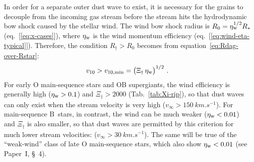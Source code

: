 In order for a separate outer dust wave to exist, it is necessary for
the grains to decouple from the incoming gas stream before the stream
hits the hydrodynamic bow shock caused by the stellar wind.  The wind
bow shock radius is \(R_0 = \eta_{\text{w}}^{1/2} R_*\) (eq.~[\ref{eq:x-cases}]),
where \(\eta_{\text{w}}\) is the wind momentum efficiency
(eq.~[\ref{eq:wind-eta-typical}]).
Therefore, the condition
\(R_\dag > R_0\) becomes from equation~\eqref{eq:Rdag-over-Rstar}:
\begin{equation}
  \label{eq:dust-wave-velocity-condition}
  v_{10} > v_{10,\text{min}} = \bigl( \Xi_\dag \, \eta_{\text{w}} \bigr)^{1/2} \ . 
\end{equation}
For early O main-sequence stars and OB supergiants, the wind
efficiency is generally high (\(\eta_{\text{w}} > 0.1\)) and
\(\Xi_\dag > 2000\) (Tab.~\ref{tab:Xi-rip}), so that dust waves can only
exist when the stream velocity is very high
(\(v_\infty > \SI{150}{km.s^{-1}}\)).  For main-sequence B~stars, in
contrast, the wind can be much weaker (\(\eta_{\text{w}} < 0.01\)) and
\(\Xi_\dag\) is also smaller, so that dust waves are permitted by this
criterion for much lower stream velocities:
(\(v_\infty > \SI{30}{km.s^{-1}}\)).  The same will be true of the
``weak-wind'' class of late O main-sequence stars, which also show
\(\eta_{\text{w}} < 0.01\) (see Paper~I, \S~4).

